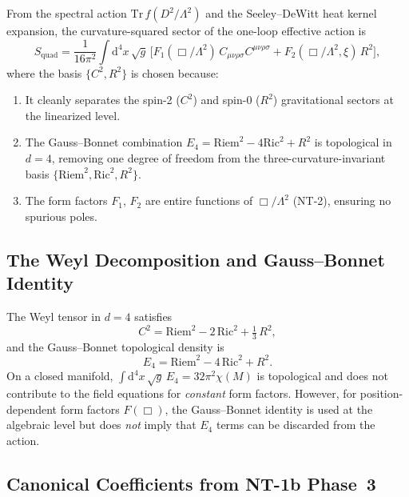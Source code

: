 \documentclass[11pt,a4paper]{article}
\newcommand{\Rsq}{R^2}
\newcommand{\Weylsq}{C_{\mu\nu\rho\sigma}C^{\mu\nu\rho\sigma}}
\renewcommand{\dd}{\mathrm{d}}
\theoremstyle{plain}
\theoremstyle{definition}
\begin{document}
From the spectral action $\mathrm{Tr}\,f(D^2/\Lambda^2)$ and the
Seeley--DeWitt heat kernel expansion, the curvature-squared sector of
the one-loop effective action is
\begin{equation}\label{eq:S-quad}
  S_{\mathrm{quad}} = \frac{1}{16\pi^2}\int\dd^4 x\,\sqrt{g}\,
  \bigl[F_1(\Box/\Lambda^2)\,\Weylsq
  + F_2(\Box/\Lambda^2,\xi)\,\Rsq\bigr],
\end{equation}
where the basis $\{C^2, R^2\}$ is chosen because:
\begin{enumerate}[nosep]
  \item It cleanly separates the spin-2 ($C^2$) and spin-0 ($R^2$)
    gravitational sectors at the linearized level.
  \item The Gauss--Bonnet combination $E_4 = \mathrm{Riem}^2 - 4\mathrm{Ric}^2 + R^2$
    is topological in $d=4$, removing one degree of freedom from the
    three-curvature-invariant basis
    $\{\mathrm{Riem}^2, \mathrm{Ric}^2, R^2\}$.
  \item The form factors $F_1$, $F_2$ are entire functions of
    $\Box/\Lambda^2$ (NT-2), ensuring no spurious poles.
\end{enumerate}

\subsection{The Weyl Decomposition and Gauss--Bonnet Identity}

The Weyl tensor in $d = 4$ satisfies
\begin{equation}\label{eq:weyl-decomp}
  C^2 = \mathrm{Riem}^2 - 2\,\mathrm{Ric}^2 + \tfrac{1}{3}\,R^2,
\end{equation}
and the Gauss--Bonnet topological density is
\begin{equation}\label{eq:GB}
  E_4 = \mathrm{Riem}^2 - 4\,\mathrm{Ric}^2 + R^2.
\end{equation}
On a closed manifold, $\int\dd^4 x\,\sqrt{g}\,E_4 = 32\pi^2\chi(M)$
is topological and does not contribute to the field equations for
\emph{constant} form factors. However, for position-dependent form
factors $F(\Box)$, the Gauss--Bonnet identity is used at the algebraic
level but does \emph{not} imply that $E_4$ terms can be discarded from
the action.

\subsection{Canonical Coefficients from NT-1b Phase~3}
\end{document}
